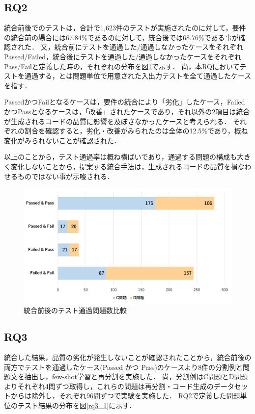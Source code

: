 \documentclass[submit,techrep,noauthor]{ipsj}
\begin{document}
\subsection{RQ2}
統合前後でのテストは，合計で1,623件のテストが実施されたのに対して，要件の統合前の場合には67.84\%であるのに対して，統合後では68.76\%である事が確認された．
又，統合前にテストを通過した/通過しなかったケースをそれぞれPassed/Failed，統合後にテストを通過した/通過しなかったケースをそれぞれPass/Failと定義した時の，それぞれの分布を図\ref{rq2_1}で示す．
尚，本RQにおいてテストを通過する，とは問題単位で用意された入出力テストを全て通過したケースを指す．

PassedかつFailとなるケースは，要件の統合により「劣化」したケース，FailedかつPassとなるケースは，「改善」されたケースであり，それ以外の2項目は統合が生成されるコードの品質に影響を及ぼさなかったケースと考えられる．
それぞれの割合を確認すると，劣化・改善がみられたのは全体の12.5\%であり，概ね変化がみられないことが確認された．

以上のことから，テスト通過率は概ね横ばいであり，通過する問題の構成も大きく変化しないことから，提案する統合手法は，生成されるコードの品質を損なわせるものではない事が示唆される．

\begin{figure}[t]
    \centering
    \includegraphics[width=1.0\linewidth]{./Toyoshima_fig/SIGSE_PF.pdf}
    \caption{統合前後のテスト通過問題数比較}
    \label{rq2_1}
\end{figure}

\subsection{RQ3}
統合した結果，品質の劣化が発生しないことが確認されたことから，統合前後の両方でテストを通過したケース(Passed かつ Pass)のケースより8件の分割例と問題文を抽出し，few-shot学習と再分割を実施した．
尚，分割例はC問題とD問題よりそれぞれ4問ずつ取得し，これらの問題は再分割・コード生成のデータセットからは除外し，それぞれ96問ずつで実験を実施した．
RQ2で定義した問題単位のテスト結果の分布を図\ref{rq3_1}に示す．
\end{document}

